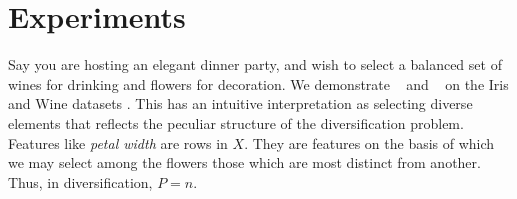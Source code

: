 \section{Experiments}
\label{sec:experiments}

Say you are hosting an elegant dinner party, and wish to select a balanced set of wines for drinking and flowers for decoration.
We demonstrate \tsip~ and \greedy~ on the Iris and Wine datasets \citep{misc_iris_53, misc_wine_109, scikit-learn}.
This has an intuitive interpretation as selecting diverse elements that reflects the peculiar structure of the diversification problem.
Features like \textit{ petal width} are rows in $X$.
They are features on the basis of which we may select among the flowers those which are most distinct from another.
Thus, in diversification, $P = n$.

